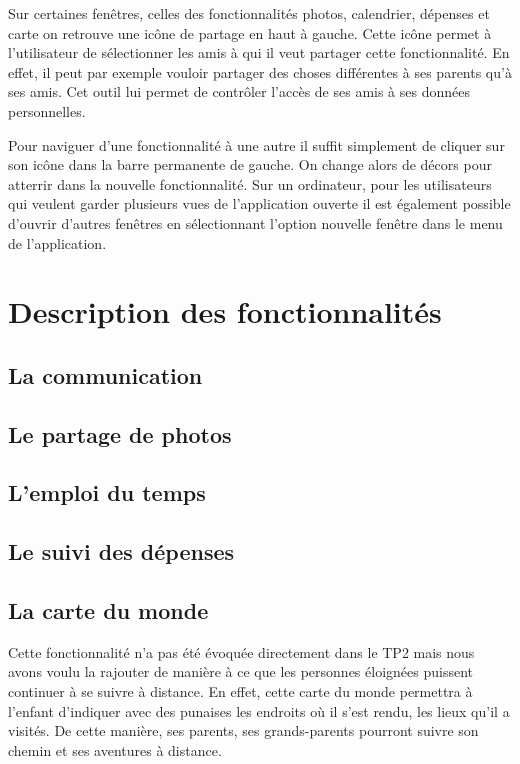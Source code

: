 \documentclass[11pt]{article}
\begin{document}
Sur certaines fenêtres, celles des fonctionnalités photos, calendrier, dépenses et carte on retrouve une icône de partage en haut à gauche. Cette icône permet à l'utilisateur de sélectionner les amis à qui il veut partager cette fonctionnalité. En effet, il peut par exemple vouloir partager des choses différentes à ses parents qu'à ses amis. Cet outil lui permet de contrôler l'accès de ses amis à ses données personnelles. 

Pour naviguer d'une fonctionnalité à une autre il suffit simplement de cliquer sur son icône dans la barre permanente de gauche. On change alors de décors pour atterrir dans la nouvelle fonctionnalité. Sur un ordinateur, pour les utilisateurs qui veulent garder plusieurs vues de l'application ouverte il est également possible d'ouvrir d'autres fenêtres en sélectionnant l'option nouvelle fenêtre dans le menu de l'application.

\section{Description des fonctionnalités}
\subsection{La communication}\label{par:com}
\subsection{Le partage de photos}\label{par:photos}
\subsection{L'emploi du temps}\label{par:cal}
\subsection{Le suivi des dépenses}\label{par:depenses}
\subsection{La carte du monde}\label{par:carte}
Cette fonctionnalité n'a pas été évoquée directement dans le TP2 mais nous avons voulu la rajouter de manière à ce que les personnes éloignées puissent continuer à se suivre à distance. En effet, cette carte du monde permettra à l'enfant d'indiquer avec des punaises les endroits où il s'est rendu, les lieux qu'il a visités. De cette manière, ses parents, ses grands-parents pourront suivre son chemin et ses aventures à distance. 
\end{document}
